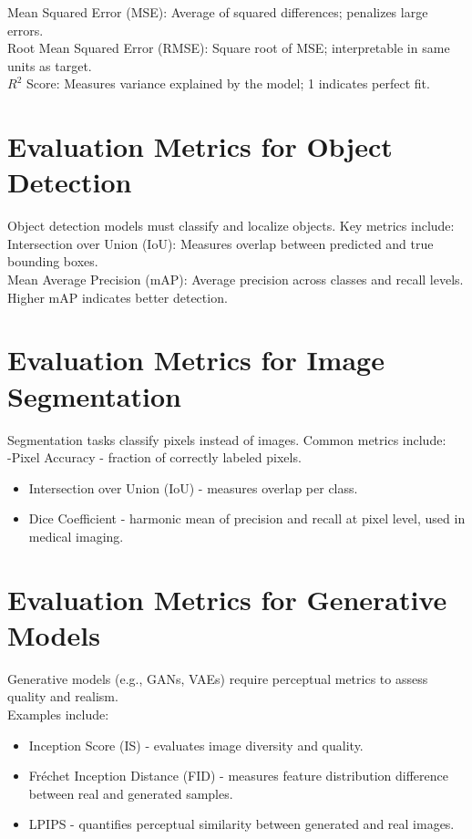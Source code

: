 \documentclass[10pt]{article}
\begin{document}
Mean Squared Error (MSE): Average of squared differences; penalizes large errors.\\
Root Mean Squared Error (RMSE): Square root of MSE; interpretable in same units as target.\\
$R^{2}$ Score: Measures variance explained by the model; 1 indicates perfect fit.

\section*{Evaluation Metrics for Object Detection}
Object detection models must classify and localize objects. Key metrics include:\\
Intersection over Union (IoU): Measures overlap between predicted and true bounding boxes.\\
Mean Average Precision (mAP): Average precision across classes and recall levels. Higher mAP indicates better detection.

\section*{Evaluation Metrics for Image Segmentation}
Segmentation tasks classify pixels instead of images. Common metrics include:\\
-Pixel Accuracy - fraction of correctly labeled pixels.

\begin{itemize}
  \item Intersection over Union (IoU) - measures overlap per class.
  \item Dice Coefficient - harmonic mean of precision and recall at pixel level, used in medical imaging.
\end{itemize}

\section*{Evaluation Metrics for Generative Models}
Generative models (e.g., GANs, VAEs) require perceptual metrics to assess quality and realism.\\
Examples include:

\begin{itemize}
  \item Inception Score (IS) - evaluates image diversity and quality.
  \item Fréchet Inception Distance (FID) - measures feature distribution difference between real and generated samples.
  \item LPIPS - quantifies perceptual similarity between generated and real images.
\end{itemize}
\end{document}
